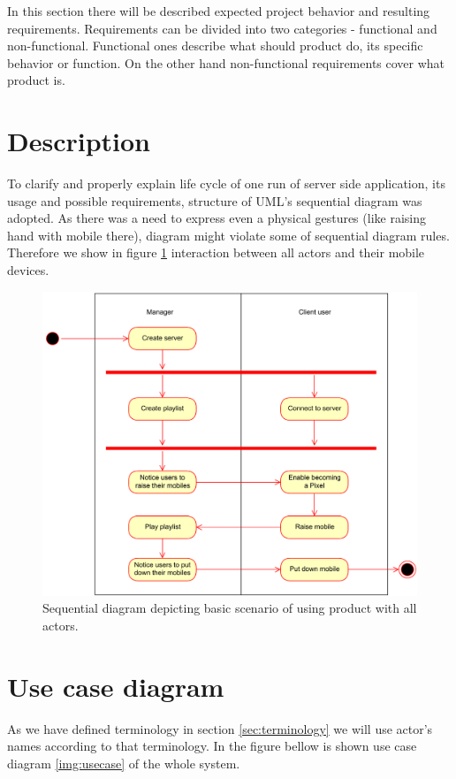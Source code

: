 In this section there will be described expected project behavior and resulting requirements. 
Requirements can be divided into two categories - functional and non-functional. 
Functional ones describe what should product do, its specific behavior or function.
On the other hand non-functional requirements cover what product is.

\section{Description}
To clarify and properly explain life cycle of one run of server side application, its usage and possible requirements, structure of UML's sequential diagram was adopted. 
As there was a need to express even a physical gestures (like raising hand with mobile there), diagram might violate some of sequential diagram rules.
Therefore we show in figure \ref{img:wholeapp_seq} interaction between all actors and their mobile devices.

\begin{figure}[!h]
    \begin{center}
    \includegraphics[scale=0.4]{images/activity_diagram.pdf}
    \caption{Sequential diagram depicting basic scenario of using product with all actors.}
    \label{img:wholeapp_seq}
    \end{center}
\end{figure}


\section{Use case diagram}
As we have defined terminology in section \ref{sec:terminology} we will use actor's names according to that terminology.
In the figure bellow is shown use case diagram \ref{img:usecase} of the whole system.

